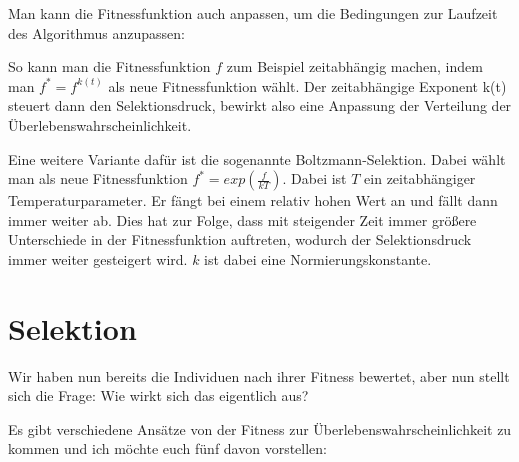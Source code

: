 Man kann die Fitnessfunktion auch anpassen, um die Bedingungen zur Laufzeit des Algorithmus anzupassen:

So kann man die Fitnessfunktion $f$ zum Beispiel zeitabhängig machen, indem man $f^*=f^{k(t)}$ als neue Fitnessfunktion wählt. Der zeitabhängige Exponent k(t) steuert dann den Selektionsdruck, bewirkt also eine Anpassung der Verteilung der Überlebenswahrscheinlichkeit.

Eine weitere Variante dafür ist die sogenannte Boltzmann-Selektion. Dabei wählt man als neue Fitnessfunktion $f^*=exp(\frac{f}{kT})$. Dabei ist $T$ ein zeitabhängiger Temperaturparameter. Er fängt bei einem relativ hohen Wert an und fällt dann immer weiter ab. Dies hat zur Folge, dass mit steigender Zeit immer größere Unterschiede in der Fitnessfunktion auftreten, wodurch der Selektionsdruck immer weiter gesteigert wird. $k$ ist dabei eine Normierungskonstante.

\section{Selektion}
Wir haben nun bereits die Individuen nach ihrer Fitness bewertet, aber nun stellt sich die Frage:
Wie wirkt sich das eigentlich aus?

Es gibt verschiedene Ansätze von der Fitness zur Überlebenswahrscheinlichkeit zu kommen und ich möchte euch fünf davon vorstellen:


